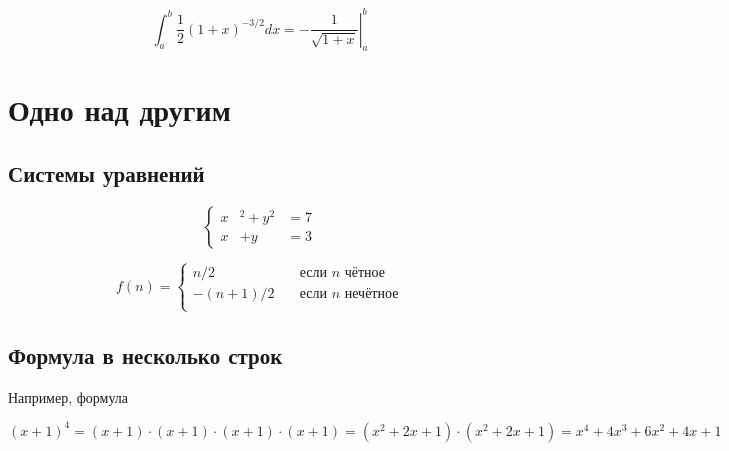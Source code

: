 \documentclass[12pt, a4paper]{article}
\begin{document}
\[ \int_a^b \frac{1}{2} (1+x)^{-3/2} dx = \left. -\frac{1}{\sqrt{1+x}} \right|_a^b \]





\section{Одно над другим}

\subsection{Системы уравнений}

\begin{equation}
	\left \{
	\begin{aligned}
		x&^2+y^2&=7\\
		x&+y & = 3 
	\end{aligned}
	\right.
\end{equation}

\[ f(n) =
  \begin{cases}
    n/2       & \quad \text{если } n \text{ чётное} \\
    -(n+1)/2  & \quad \text{если } n \text{ нечётное}\\
  \end{cases}
\]





\subsection{Формула в несколько строк}


Например, формула

 \[(x+1)^4 = (x+1) \cdot (x+1) \cdot (x+1) \cdot (x+1) = (x^2 + 2x + 1) \cdot (x^2 + 2x + 1) = x^4 + 4x^3 + 6x^2 + 4x+ 1 \]
\end{document}
